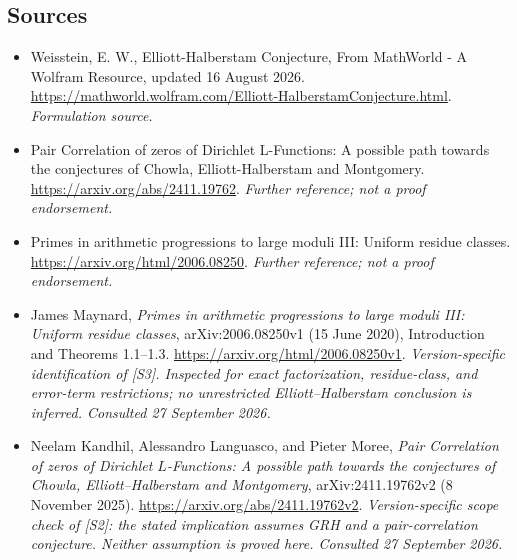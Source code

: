\documentclass[11pt]{article}
\begin{document}
\subsection{Sources}
\begin{itemize}
\item[S1]Weisstein, E. W., Elliott-Halberstam Conjecture, From MathWorld - A Wolfram Resource, updated 16 August 2026.
\url{https://mathworld.wolfram.com/Elliott-HalberstamConjecture.html}.
\textit{Formulation source.}
\item[S2]Pair Correlation of zeros of Dirichlet L-Functions: A possible path towards the conjectures of Chowla, Elliott-Halberstam and Montgomery.
\url{https://arxiv.org/abs/2411.19762}.
\textit{Further reference; not a proof endorsement.}
\item[S3]Primes in arithmetic progressions to large moduli III: Uniform residue classes.
\url{https://arxiv.org/html/2006.08250}.
\textit{Further reference; not a proof endorsement.}

\item[E1]James Maynard, \emph{Primes in arithmetic progressions to large
moduli III: Uniform residue classes}, arXiv:2006.08250v1 (15 June 2020),
Introduction and Theorems 1.1--1.3.
\url{https://arxiv.org/html/2006.08250v1}.
\textit{Version-specific identification of [S3]. Inspected for exact
factorization, residue-class, and error-term restrictions; no unrestricted
Elliott--Halberstam conclusion is inferred. Consulted 27 September 2026.}
\item[E2]Neelam Kandhil, Alessandro Languasco, and Pieter Moree,
\emph{Pair Correlation of zeros of Dirichlet $L$-Functions: A possible path
towards the conjectures of Chowla, Elliott--Halberstam and Montgomery},
arXiv:2411.19762v2 (8 November 2025).
\url{https://arxiv.org/abs/2411.19762v2}.
\textit{Version-specific scope check of [S2]: the stated implication assumes
GRH and a pair-correlation conjecture. Neither assumption is proved here.
Consulted 27 September 2026.}
\end{itemize}
\end{document}

